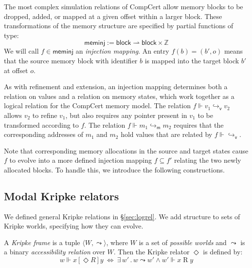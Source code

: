 \documentclass[sigplan,10pt,review]{acmart}
\newcommand{\kw}[1]{\ensuremath{ \mathsf{#1} }}
\newcommand{\ifr}[1]{\mathrel{[{#1}]}}
\begin{document}
The most complex simulation relations of CompCert
allow memory blocks to be dropped, added, or
mapped at a given offset within a larger block.
These transformations of the memory structure
are specified by partial functions of type:
\[
  \kw{meminj} := \kw{block} \rightharpoonup \kw{block} \times \mathbb{Z}
\]
We will call $f \in \kw{meminj}$
an \emph{injection mapping}.
An entry $f(b) = (b', o)$
means that the source memory block with identifier $b$
is mapped into the target block $b'$
at offset $o$.

As with refinement and extension,
an injection mapping determines both
a relation on values and
a relation on memory states,
which work together
as a logical relation for the CompCert memory model.
The relation $f \Vdash v_1 \hookrightarrow_\kw{v} v_2$
allows $v_2$ to refine $v_1$,
but also requires any pointer present in $v_1$
to be transformed according to $f$.
The relation $f \Vdash m_1 \hookrightarrow_\kw{m} m_2$
requires that the corresponding addresses of $m_1$ and $m_2$
hold values that are related by $f \Vdash {\hookrightarrow_\kw{v}}$.

Note that corresponding memory allocations
in the source and target states cause $f$ to
evolve into a more defined injection mapping $f \subseteq f'$
relating the two newly allocated blocks.
To handle this,
we introduce the following constructions.


\subsection{Modal Kripke relators} %

We defined general Kripke relations in \S\ref{sec:logrel}.
We add structure to sets of Kripke worlds,
specifying how they can evolve.

\begin{definition} %
A \emph{Kripke frame} is a tuple
$\langle W, {\leadsto} \rangle$, where
$W$ is a set of \emph{possible worlds} and
$\leadsto$ is a
binary \emph{accessibility relation} over $W$.
Then the Kripke relator $\Diamond$ is defined by:
\[
  w \Vdash x \ifr{\Diamond R} y \: \Leftrightarrow \:
    \exists \, w' \,.\, w \leadsto w' \wedge
      w' \Vdash x \mathrel{R} y
\]
\end{definition}
\end{document}

